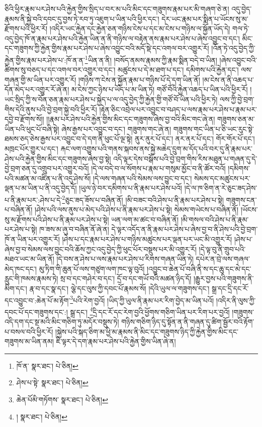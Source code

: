 ཅིའི་ཕྱིར་རྣམ་པར་ཤེས་པའི་རྐྱེན་གྱིས་སྲིད་པ་བར་མ་པའི་མིང་དང་གཟུགས་རྣམ་པར་མི་གཞག་ཅེ་ན། འདུ་བྱེད་རྣམས་ནི་སྐྱེ་བའི་དབང་དུ་བྱས་ཏེ་རབ་ཏུ་འཇུག་པ་ཡིན་པའི་ཕྱིར་དང་། དེར་ཡང་རྣམ་པར་སྨིན་པ་ཡོངས་སུ་མ་རྫོགས་པའི་ཕྱིར་རོ། །འདིར་ཡང་རྐྱེན་དང་རྐྱེན་ཅན་གཉིས་ངེས་པ་དང་མ་ངེས་པ་གཉིས་ལ་སྐྱོན་ཡོད་དེ། གལ་ཏེ་འདུ་བྱེད་ཁོ་ན་རྣམ་པར་ཤེས་པའི་རྐྱེན་ཡིན་ན་ནི་གཉིས་ལ་བརྟེན་ནས་རྣམ་པར་ཤེས་པ་ཞེས་འབྱུང་བ་དང་། མིང་དང་གཟུགས་ཀྱི་རྐྱེན་གྱིས་རྣམ་པར་ཤེས་པ་ཞེས་འབྱུང་བའི་མདོ་སྡེ་དང་འགལ་བར་འགྱུར་རོ། །འོན་ཏེ་འདུ་བྱེད་ཀྱི་རྐྱེན་གྱིས་རྣམ་པར་ཤེས་པ་:ཁོ་ན་ན་\footnote{ཁོ་ན་  སྣར་ཐང་།  པེ་ཅིན། }ཡིན་ན་ནི། །བསོད་ནམས་རྣམས་ཀྱི་རྣམ་སྨིན་བདེ་བ་ཡིན། །ཞེས་འབྱུང་བའི་ཚིགས་སུ་བཅད་པ་དང་འགལ་བར་འགྱུར་བ་དང་། མཚུངས་པ་དེ་མ་ཐག་པ་དང་། དམིགས་པའི་རྐྱེན་དང་། ལས་གཞན་གྱི་མ་ཡིན་པར་འགྱུར་རོ། །གཉིས་ཀ་ངེས་ན་སྐྱོན་རྣམ་པ་གཉིས་པོ་དེ་དག་ཡིན་ནོ། །མ་ངེས་ན་ནི་འཆད་པ་དོན་མེད་པར་འགྱུར་རོ་ཞེ་ན། མ་ངེས་ཀྱང་ཉེས་པ་ཡོད་པ་མ་ཡིན་ཏེ། གཙོ་བོའི་རྐྱེན་འཆད་པ་ཡིན་པའི་ཕྱིར་རོ། །ཡང་སྲིད་ཀྱི་ས་བོན་ཅན་རྣམ་པར་ཤེས་པ་སྐྱེད་པ་ལ་འདུ་བྱེད་ཀྱི་རྐྱེན་གྱི་གཙོ་བོ་ཡིན་པའི་ཕྱིར་ཏེ། ལས་ཀྱི་བྱེ་བྲག་གིས་དེའི་ནུས་པའི་བྱེ་བྲག་སྐྱེ་བའི་ཕྱིར་རོ། །རྟེན་ཅིང་འབྲེལ་པར་འབྱུང་བ་བཤད་པ་ལས་རྣམ་པར་ཤེས་པ་རྣམ་པར་དབྱེ་བ་རྫོགས་སོ།། །།རྣམ་པར་ཤེས་པའི་རྐྱེན་གྱིས་མིང་དང་གཟུགས་ཞེས་བྱ་བའི་མིང་གང་ཞེ་ན། གཟུགས་ཅན་མ་ཡིན་པའི་ཕུང་པོ་བཞི་སྟེ། ཞེས་རྒྱས་པར་འབྱུང་བ་དང་། གཟུགས་གང་ཞེ་ན། གཟུགས་གང་ཡིན་པ་ཅི་ཡང་རུང་སྟེ་ཐམས་ཅད་ཅེས་རྒྱས་པར་འབྱུང་བ་དེ་དག་ནི་ཕུང་པོ་ལྔ་སྟེ། ནུར་ནུར་པོ་དང་། ནར་ནར་པོ་དང་། གོར་གོར་པོ་དང་། མཁྲང་པོར་གྱུར་པ་དང་། རྐང་ལག་འགྱུས་པའི་གནས་སྐབས་ནས་སྐྱེ་མཆེད་དྲུག་མ་དོད་པའི་བར་དུ་ནི་རྣམ་པར་ཤེས་པའི་རྐྱེན་གྱིས་མིང་དང་གཟུགས་ཞེས་བྱ་སྟེ། འདི་ལྟར་དེས་བསྒོས་པའི་བྱེ་བྲག་གིས་རིས་མཐུན་པ་གཞན་དུ་དེ་བྱེ་བྲག་ཅན་དུ་འགྲུབ་པར་འགྱུར་བའོ། །དེ་ལ་བདེ་བ་ལ་སོགས་པ་རྣམ་པ་གསུམ་མྱོང་བ་ནི་ཚོར་བའོ། །དམིགས་པའི་མཚན་མ་འཛིན་པ་ནི་འདུ་ཤེས་སོ། །དེ་ལས་གཞན་པའི་སེམས་ལས་བྱུང་བ་དང་། སེམས་དང་མཚུངས་པར་ལྡན་པ་མ་ཡིན་པ་ནི་འདུ་བྱེད་དོ། །ཡུལ་ཉེ་བར་དམིགས་པ་ནི་རྣམ་པར་ཤེས་པའོ། །དེ་ལ་ཁ་ཅིག་ན་རེ་ཅུང་ཟད་ཤེས་པ་ནི་རྣམ་པར་:ཤེས་པ་དེ་\footnote{ཤེས་པ་སྟེ་  སྣར་ཐང་།  པེ་ཅིན། }ཅུང་ཟད་ཟོས་པ་བཞིན་ནོ། །མི་བཟང་བའི་ཤེས་པ་ནི་རྣམ་པར་ཤེས་པ་སྟེ། གཟུགས་ངན་པ་བཞིན་ནོ། །ཤེས་པའི་ལས་ནུས་པ་མེད་པའི་ཤེས་པ་ནི་རྣམ་པར་ཤེས་པ་སྟེ། སེམས་གཡེངས་པ་བཞིན་ནོ། །ཡོངས་སུ་མ་རྫོགས་པའི་ཤེས་པ་ནི་རྣམ་པར་ཤེས་པ་སྟེ། ཡན་ལག་མ་ཚང་བ་བཞིན་ནོ། །མི་གསལ་བའི་ཤེས་པ་ནི་རྣམ་པར་ཤེས་པ་སྟེ། ཁ་ཟས་མ་ཞུ་བ་བཞིན་ནོ་ཞེ་ན། དེ་ལྟར་འདོད་ན་ནི་རྣམ་པར་ཤེས་པ་ཞེས་བྱ་བ་ནི་ཤེས་པའི་བྱེ་བྲག་ཁོ་ན་ཡིན་པར་འགྱུར་རོ། །ཤེས་པ་དང་རྣམ་པར་ཤེས་པ་གཉིས་མཚུངས་པར་ལྡན་པར་ཡང་མི་འགྱུར་རོ། །ཤེས་པ་ཞེས་བྱ་བ་སེམས་ལས་བྱུང་བའི་ཆོས་ཀྱང་འདུ་བྱེད་ཀྱི་ཕུང་པོར་བསྡུས་པར་མི་འགྱུར་རོ། །དེ་ལྟ་བུ་ནི་གྲུབ་པའི་མཐའ་ཡང་མ་ཡིན་ནོ། །དེ་བས་ན་ཤེས་པ་ལས་རྣམ་པར་ཤེས་པ་རིགས་གཞན་ཡིན་ཏེ། དཔེར་ན་བྲེ་ལས་གཞལ་མེད་ཁང་དང་། མུ་ཏིག་གི་ཆུན་པོ་ལས་གཙུག་ལག་ཁང་ལྟ་བུའོ། །འབྱུང་བ་ཆེན་པོ་བཞི་ནི་ས་དང་ཆུ་དང་མེ་དང་རླུང་གི་ཁམས་རྣམས་ཏེ། སྲ་བ་དང་གཤེར་བ་དང་། དྲོ་བ་དང་གཡོ་བའི་མཚན་ཉིད་དོ། །རྒྱུར་བྱས་པའི་གཟུགས་ནི་མིག་དང་། རྣ་བ་དང་སྣ་དང་། ལྕེ་དང་ལུས་ཀྱི་དབང་པོ་རྣམས་སོ། །དེའི་ཡུལ་ལ་གཟུགས་དང་། སྒྲ་དང་དྲི་དང་རོ་དང་འབྱུང་བ་:ཆེན་པོ་མ་རྟོག་\footnote{ཆེན་པོམི་གཏོགས་  སྣར་ཐང་།  པེ་ཅིན། }པའི་རེག་བྱའོ། །ཡིད་ཀྱི་ཡུལ་ནི་རྣམ་པར་རིག་བྱེད་མ་ཡིན་པའོ། །འདིར་ནི་ལུས་ཀྱི་དབང་པོ་དང་གཟུགས་དང་:། སྒྲ་དང་། \footnote{།    སྣར་ཐང་།  པེ་ཅིན། }དྲི་དང་རོ་དང་རེག་བྱའི་ཕྱོགས་གཅིག་ཡིན་པར་རིག་པར་བྱའོ། །གཟུགས་འདི་དག་དང་སྔ་མའི་མིང་གཅིག་ཏུ་མདོར་བསྡུས་ཏེ། གཉིས་གཅིག་ཉིད་དུ་སྟོན་ན་ནི་གཞན་དུ་ཚིག་སྦྱོར་བའི་རྟོག་པ་བསལ་བའི་ཕྱིར་རོ། །སྐྱེས་པའི་སྐད་ཅིག་མ་ཕྱི་མ་རྣམས་ནི་མིང་དང་གཟུགས་ཉིད་ཀྱི་རྐྱེན་གྱིས་མིང་དང་གཟུགས་མ་ཡིན་ནམ། ཇི་ལྟར་དེ་དག་རྣམ་པར་ཤེས་པའི་རྐྱེན་གྱིས་ཡིན་ཞེ་ན། 